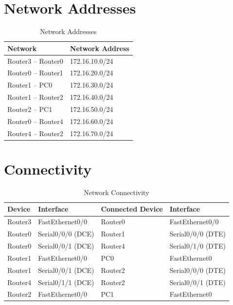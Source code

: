 \documentclass[12pt, a4paper]{report}
\begin{document}
\section*{Network Addresses}
\begin{table}[H]
	\centering
	\begin{tabular}{|l|l|}
		\hline
		\textbf{Network} & \textbf{Network Address} \\ \hline
		Router3 -- Router0 & 172.16.10.0/24 \\ \hline
		Router0 -- Router1 & 172.16.20.0/24 \\ \hline
		Router1 -- PC0     & 172.16.30.0/24 \\ \hline
		Router1 -- Router2 & 172.16.40.0/24 \\ \hline
		Router2 -- PC1     & 172.16.50.0/24 \\ \hline
		Router0 -- Router4 & 172.16.60.0/24 \\ \hline
		Router4 -- Router2 & 172.16.70.0/24 \\ \hline
	\end{tabular}
	\caption{Network Addresses}
\end{table}

\section*{Connectivity}
\begin{table}[H]
	\centering
	\begin{tabular}{|l|l|l|l|}
		\hline
		\textbf{Device} & \textbf{Interface} & \textbf{Connected Device} & \textbf{Interface} \\ \hline
		Router3 & FastEthernet0/0   & Router0 & FastEthernet0/0   \\ \hline
		Router0 & Serial0/0/0 (DCE) & Router1 & Serial0/0/0 (DTE) \\ \hline
		Router0 & Serial0/0/1 (DCE) & Router4 & Serial0/1/0 (DTE) \\ \hline
		Router1 & FastEthernet0/0   & PC0     & FastEthernet0     \\ \hline
		Router1 & Serial0/0/1 (DCE) & Router2 & Serial0/0/0 (DTE) \\ \hline
		Router4 & Serial0/1/1 (DCE) & Router2 & Serial0/0/1 (DTE) \\ \hline
		Router2 & FastEthernet0/0   & PC1     & FastEthernet0     \\ \hline
	\end{tabular}
	\caption{Network Connectivity}
\end{table}
\end{document}
